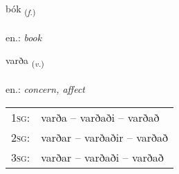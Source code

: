 \documentclass[frontgrid, backgrid]{flacards}\usepackage[]{graphicx}\usepackage[]{xcolor}
\begin{document}
\renewcommand{\blhead}{\vskip5pt {\small\bfseries\footnotesize Nafnorð | Noun }}
\renewcommand{\bcfoot}{\vskip5pt \hspace{2pt}{\small\bfseries\footnotesize 1K}}


{bók \small{\textsubscript{(\textit{f.})}} \\[1ex] %
\textphonetic{[pouːk]} \\
en.: \emph{book} \\  [2ex]
\renewcommand*{\arraystretch}{0.8}
}

\renewcommand{\flhead}{\vskip5pt \fboxsep=0pt {\small\bfseries\footnotesize Sagnorð | Verb}}
\renewcommand{\fcfoot}{\vskip5pt \fboxsep=0pt \hspace{2pt}{\small\bfseries\footnotesize 1K}}

\renewcommand{\blhead}{\vskip5pt {\small\bfseries\footnotesize Sagnorð | Verb }}
\renewcommand{\bcfoot}{\vskip5pt \hspace{2pt}{\small\bfseries\footnotesize 1K}}


{varða \small{\textsubscript{(\textit{v.})}} \\[1ex] %
\textphonetic{[varða]} \\
en.: \emph{concern, affect} \\  [2ex]
\renewcommand*{\arraystretch}{0.8}
\begin{tabular}{p{1cm}l}
\textsc{1sg}: & varða -- varðaði -- varðað \\ 
\textsc{2sg}: & varðar -- varðaðir -- varðað \\ 
\textsc{3sg}: & varðar -- varðaði -- varðað \\ 
\end{tabular}
}

\end{document}
